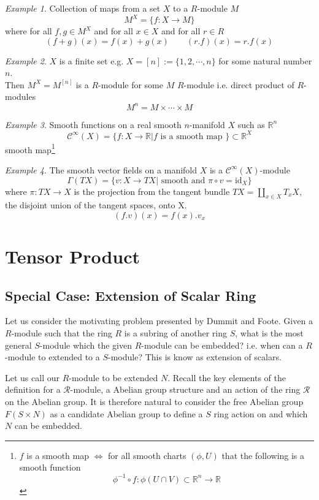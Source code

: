 \documentclass{article}
\theoremstyle{plain}
\theoremstyle{definition}
\theoremstyle{remark}
\newtheorem{eg}{Example}[section]
\begin{document}
  \begin{eg}
    Collection of maps from a set $X$ to a $R$-module $M$  
    \[M^X=\{ f:X\to M \}\]
    where for all $f,g\in M^X$ and for all $x\in X$ and for all $r\in R$
    \[(f+g)(x)=f(x)+g(x)\qquad(r.f)(x)=r.f(x)\]
  \end{eg}
  \begin{eg}
    $X$ is a finite set e.g. $X=[n]:=\{1,2,\cdots,n\}$ for some 
    natural number $n$.
    \\[1em]
    Then $M^X=M^{[n]}$ is a $R$-module for some 
    $M$ $R$-module i.e. direct product of $R$-modules 
    \[M^n=M\times \cdots\times M\]
  \end{eg}
  \begin{eg}
    Smooth functions on a real smooth $n$-manifold $X$ such as $\mathbb{R}^n$
    \[\mathcal{C}^\infty(X)=\{f:X\to\mathbb{R} | f\text{ is a smooth map
    }\}\subset\mathbb{R}^X\]
    smooth map\footnote{
      $f$ is a smooth map $\iff$ for all smooth charts $(\phi,U)$ that 
      the following is a smooth function
      \[\phi^{-1}\circ f:\phi(U\cap V)\subset\mathbb{R}^n\to\mathbb{R}\] 
    } 
  \end{eg}
  \begin{eg}
    The smooth vector fields on a manifold $X$ is a 
    $\mathcal{C}^\infty(X)$-module
    \[ \Gamma(TX)=\{v:X\to TX |\text{ smooth and }\pi\circ v=\text{id}_X\}\]
    where $\pi:TX\to X$ is the projection from the tangent bundle
    $TX=\amalg_{x\in X}T_xX$, the disjoint union of the tangent spaces, onto X.
    \[ (f.v)(x)=f(x).v_x \]
  \end{eg}
\section{Tensor Product}
\subsection{Special Case: Extension of Scalar Ring}
  Let us consider the motivating problem presented by Dummit and Foote. Given
  a $R$-module such that the ring $R$ is a subring of another ring $S$, what is the most
  general $S$-module which the given $R$-module can be embedded? i.e. when can
  a $R$-module to extended to a $S$-module? This is know as extension of 
  scalars.

  Let us call our $R$-module to be extended $N$.
  Recall the key elements of the definition for a $\mathcal{R}$-module, a Abelian group
  structure and an action of the ring $\mathcal{R}$ on the Abelian group.
  It is therefore natural to consider the free Abelian group $F(S\times N)$
  as a candidate Abelian group to define a $S$ ring action on and which $N$
  can be embedded.
\end{document}
